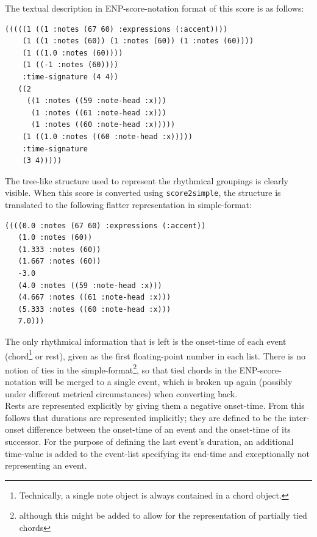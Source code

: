 \documentclass[runningheads,a4paper]{llncs}
\begin{document}
The textual description in ENP-score-notation format of this score is
as follows:

\begin{scriptsize}
\begin{verbatim}
(((((1 ((1 :notes (67 60) :expressions (:accent))))
    (1 ((1 :notes (60)) (1 :notes (60)) (1 :notes (60))))
    (1 ((1.0 :notes (60))))
    (1 ((-1 :notes (60))))
    :time-signature (4 4))
   ((2
     ((1 :notes ((59 :note-head :x)))
      (1 :notes ((61 :note-head :x)))
      (1 :notes ((60 :note-head :x)))))
    (1 ((1.0 :notes ((60 :note-head :x)))))
    :time-signature
    (3 4)))))

\end{verbatim}
\end{scriptsize}

The tree-like structure used to represent the rhythmical groupings is
clearly visible. When this score is converted using
\texttt{score2simple}, the structure is translated to the following
flatter representation in simple-format:

\begin{scriptsize}
\begin{verbatim}
((((0.0 :notes (67 60) :expressions (:accent))
   (1.0 :notes (60))
   (1.333 :notes (60))
   (1.667 :notes (60))
   -3.0
   (4.0 :notes ((59 :note-head :x)))
   (4.667 :notes ((61 :note-head :x)))
   (5.333 :notes ((60 :note-head :x)))
   7.0)))
\end{verbatim}
\end{scriptsize}

The only rhythmical information that is left is the onset-time of each
event (chord\footnote{Technically, a single note object is always
  contained in a chord object.}  or rest), given as the first
floating-point number in each list. There is no notion of ties in the
simple-format\footnote{although this might be added to allow for the
  representation of partially tied chords}, so that tied chords in the
ENP-score-notation will be merged to a single event, which is broken
up again (possibly under different metrical circumstances) when
converting back. \\
Rests are represented explicitly by giving them a negative
onset-time. From this follows that durations are represented
implicitly; they are defined to be the inter-onset difference between
the onset-time of an event and the onset-time of its successor. For
the purpose of defining the last event's duration, an additional
time-value is added to the event-list specifying its
end-time and exceptionally not representing an event.
\end{document}
